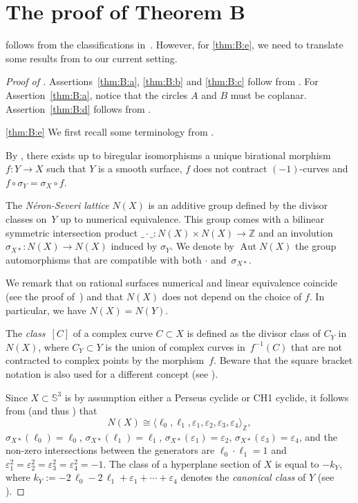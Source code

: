 \documentclass[11pt]{article}
\renewcommand{\S}{\mathbb{S}}
\newcommand{\Z}{\mathbb{Z}}
\renewcommand{\c}{\colon}
\newcommand{\aut}{\operatorname{Aut}}
\newcommand{\df}{\emph}
\renewcommand{\k}{k}
\renewcommand{\l}{\ell}
\newcommand{\p}{\varepsilon}
\newcommand{\bas}[1]{\langle #1\rangle}
\begin{document}
\appendix
\addappheadtotoc

\section{The proof of Theorem B}
\label{app:B}

 follows from the classifications in~\cite{2023trans}.
However, for \ref{thm:B:e}, we need to translate some results from
\cite{2023trans} to our current setting.

\begin{proof}[Proof of ]
Assertions~\ref{thm:B:a}, \ref{thm:B:b} and \ref{thm:B:c}
follow from \citep[Theorem~1(b) and Corollary~2]{2023trans}.
For Assertion~\ref{thm:B:a},
notice that the circles $A$ and $B$ must be coplanar.
Assertion~\ref{thm:B:d} follows from \citep[Theorem~A and Table~5]{2023trans}.

\ref{thm:B:e}
We first recall some terminology
from \cite{2023trans}.

By \citep[Theorem~2.16]{2007}, there exists up to biregular isomorphisms
a unique birational morphism~$f\c Y\to X$
such that $Y$ is a smooth surface,
$f$ does not contract $(-1)$-curves and $f\circ \sigma_Y=\sigma_X\circ f$.

The \df{N\'eron-Severi lattice} $N(X)$ is
an additive group  defined by the divisor classes on~$Y$ up to numerical equivalence.
This group comes with a bilinear symmetric intersection product $\_\cdot\_\c N(X)\times N(X)\to\Z$
and an involution
$
\sigma_{X*}\c N(X)\to N(X)
$
induced by $\sigma_Y$.
We denote by $\aut N(X)$ the group automorphisms that are compatible
with both $\cdot$ and~$\sigma_{X*}$.

We remark that on rational surfaces numerical and linear equivalence coincide
(see the proof of~\citep[Lemma~4.9]{2018sko})
and that $N(X)$ does not depend on the choice of $f$. In particular, we have $N(X)=N(Y)$.

The \df{class}~$[C]$ of a complex curve $C\subset X$ is defined as the divisor class of $C_Y$ in $N(X)$,
where $C_Y\subset Y$ is the union of complex curves
in~$f^{-1}(C)$ that are not contracted to complex points
by the morphism~$f$. Beware that the square bracket notation is also
used for a different concept (see ).

Since $X\subset\S^3$ is by assumption either a Perseus cyclide or CH1 cyclide,
it follows from \citep[Theorem~A]{2023trans} (and thus \citep[Theorem~4]{2021circ}) that
\[
N(X)\cong\bas{\l_0,\l_1,\p_1,\p_2,\p_3,\p_4}_\Z,
\]
$\sigma_{X*}(\l_0)=\l_0$,
$\sigma_{X*}(\l_1)=\l_1$,
$\sigma_{X*}(\p_1)=\p_2$,
$\sigma_{X*}(\p_3)=\p_4$,
and the non-zero intersections between the generators are $\l_0\cdot\l_1=1$ and $\p_1^2=\p_2^2=\p_3^2=\p_4^2=-1$.
The class of a hyperplane section of $X$ is
equal to $-\k_Y$, where $\k_Y:=-2\,\l_0-2\,\l_1+\p_1+\cdots+\p_4$ denotes the \df{canonical class} of $Y$
(see \citep[Section~2]{2021circ}).


\end{proof}
\end{document}
